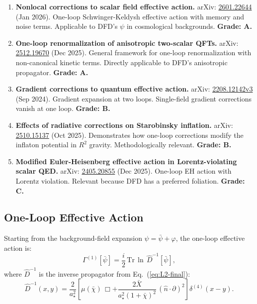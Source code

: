 \documentclass[11pt,a4paper]{article}
\begin{document}
\begin{enumerate}
\item \textbf{Nonlocal corrections to scalar field effective action.} arXiv: \href{https://arxiv.org/abs/2601.22644}{2601.22644} (Jan 2026). One-loop Schwinger-Keldysh effective action with memory and noise terms. Applicable to DFD's $\psi$ in cosmological backgrounds. \textbf{Grade: A.}

\item \textbf{One-loop renormalization of anisotropic two-scalar QFTs.} arXiv: \href{https://arxiv.org/abs/2512.19670}{2512.19670} (Dec 2025). General framework for one-loop renormalization with non-canonical kinetic terms. Directly applicable to DFD's anisotropic propagator. \textbf{Grade: A.}

\item \textbf{Gradient corrections to quantum effective action.} arXiv: \href{https://arxiv.org/abs/2208.12142}{2208.12142v3} (Sep 2024). Gradient expansion at two loops. Single-field gradient corrections vanish at one loop. \textbf{Grade: B.}

\item \textbf{Effects of radiative corrections on Starobinsky inflation.} arXiv: \href{https://arxiv.org/abs/2510.15137}{2510.15137} (Oct 2025). Demonstrates how one-loop corrections modify the inflaton potential in $R^2$ gravity. Methodologically relevant. \textbf{Grade: B.}

\item \textbf{Modified Euler-Heisenberg effective action in Lorentz-violating scalar QED.} arXiv: \href{https://arxiv.org/abs/2405.20855}{2405.20855} (Dec 2025). One-loop EH action with Lorentz violation. Relevant because DFD has a preferred foliation. \textbf{Grade: C.}
\end{enumerate}

\subsection{One-Loop Effective Action}
\label{sec:one-loop}

Starting from the background-field expansion $\psi = \bar\psi + \varphi$, the one-loop effective action is:
\begin{equation}\label{eq:Gamma-1loop}
\Gamma^{(1)}[\bar\psi] = \frac{i}{2}\,\text{Tr}\,\ln\,\hat{D}^{-1}[\bar\psi],
\end{equation}
where $\hat{D}^{-1}$ is the inverse propagator from Eq.~(\ref{eq:L2-final}):
\begin{equation}
\hat{D}^{-1}(x,y) = \frac{2}{a_\star^2}\left[
\mu(\bar\chi)\,\Box
+ \frac{2\bar{X}}{a_\star^2(1+\bar\chi)^2}\,(\hat{n}\cdot\partial)^2
\right]\delta^{(4)}(x-y).
\end{equation}
\end{document}
